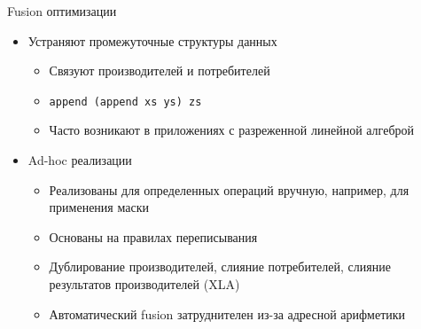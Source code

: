 \documentclass[xcolor=table,aspectratio=169]{beamer}
\begin{document}
\begin{frame}[fragile]{Fusion оптимизации}

\begin{itemize}
            \item Устраняют промежуточные структуры данных
            \vfill
            \begin{itemize}
                \item Связуют производителей и потребителей
                \vfill
                \item \texttt{append (append xs ys) zs}
                \vfill
                \item Часто возникают в приложениях с разреженной линейной алгеброй
            \end{itemize}
            \vfill
            \item Ad-hoc реализации
            \vfill
            \begin{itemize}
                \item Реализованы для определенных операций вручную, например, для применения маски
                \vfill
                \item Основаны на правилах переписывания
                \vfill
                \item Дублирование производителей, слияние потребителей, слияние результатов производителей (XLA)
                \vfill
                \item Автоматический fusion затруднителен из-за адресной арифметики 
            \end{itemize}
        \end{itemize}
    
\end{frame}


\end{document}
